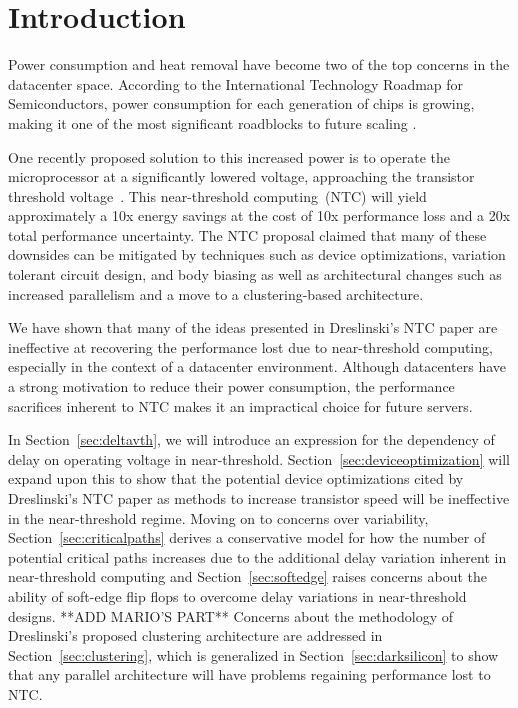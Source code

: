 \section{Introduction}
\label{sec:intro}

Power consumption and heat removal have become two of the top concerns in the datacenter space\cite{EPA_2007}. 
According to the International Technology Roadmap for Semiconductors, power consumption for each generation of chips is growing, making it one of the most significant roadblocks to future scaling \cite{Devised_2009}. 

One recently proposed  solution to this increased power is to operate the microprocessor at a significantly lowered voltage, approaching the transistor threshold voltage~\cite{Dreslinski:2010ez}. 
This near-threshold computing~(NTC) will yield approximately a 10x energy savings at the cost of 10x performance loss and a 20x total performance uncertainty. 
The NTC proposal claimed that many of these downsides can be mitigated by techniques such as device optimizations, variation tolerant circuit design, and body biasing as well as architectural changes such as increased parallelism and a move to a clustering-based architecture.

We have shown that many of the ideas presented in Dreslinski's NTC paper \cite{Dreslinski:2010ez} are ineffective at recovering the performance lost due to near-threshold computing, especially in the context of a datacenter environment. 
Although datacenters have a strong motivation to reduce their power consumption, the performance sacrifices inherent to NTC makes it an impractical choice for future servers.

In Section~\ref{sec:deltavth}, we will introduce an expression for the dependency of delay on operating voltage in near-threshold.
Section~\ref{sec:deviceoptimization} will expand upon this to show that the potential device optimizations cited by Dreslinski's NTC paper as methods to increase transistor speed will be ineffective in the near-threshold regime.
Moving on to concerns over variability, Section~\ref{sec:criticalpaths} derives a conservative model for how the number of potential critical paths increases due to the additional delay variation inherent in near-threshold computing and Section~\ref{sec:softedge} raises concerns about the ability of soft-edge flip flops to overcome delay variations in near-threshold designs.
**ADD MARIO'S PART**
Concerns about the methodology of Dreslinski's proposed clustering architecture are addressed in Section~\ref{sec:clustering}, which is generalized in Section~\ref{sec:darksilicon} to show that any parallel architecture will have problems regaining performance lost to NTC.

